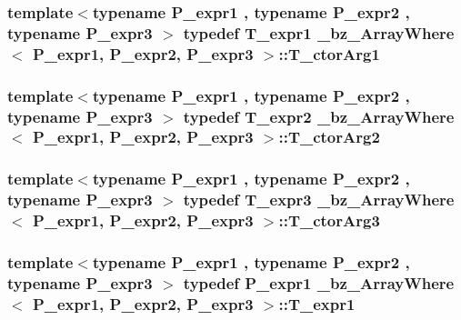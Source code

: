\subsubsection[{T\+\_\+ctor\+Arg1}]{\setlength{\rightskip}{0pt plus 5cm}template$<$typename P\+\_\+expr1 , typename P\+\_\+expr2 , typename P\+\_\+expr3 $>$ typedef {\bf T\+\_\+expr1} {\bf \+\_\+bz\+\_\+\+Array\+Where}$<$ P\+\_\+expr1, P\+\_\+expr2, P\+\_\+expr3 $>$\+::{\bf T\+\_\+ctor\+Arg1}}\label{class__bz__ArrayWhere_a32c58caf104cc6fe6f26de21ebacf028}
\hypertarget{class__bz__ArrayWhere_ab66d71f81e4b0458bb111d8a723e8caa}{}
\subsubsection[{T\+\_\+ctor\+Arg2}]{\setlength{\rightskip}{0pt plus 5cm}template$<$typename P\+\_\+expr1 , typename P\+\_\+expr2 , typename P\+\_\+expr3 $>$ typedef {\bf T\+\_\+expr2} {\bf \+\_\+bz\+\_\+\+Array\+Where}$<$ P\+\_\+expr1, P\+\_\+expr2, P\+\_\+expr3 $>$\+::{\bf T\+\_\+ctor\+Arg2}}\label{class__bz__ArrayWhere_ab66d71f81e4b0458bb111d8a723e8caa}
\hypertarget{class__bz__ArrayWhere_a5ae4e744d3c88348295b3976c109122d}{}
\subsubsection[{T\+\_\+ctor\+Arg3}]{\setlength{\rightskip}{0pt plus 5cm}template$<$typename P\+\_\+expr1 , typename P\+\_\+expr2 , typename P\+\_\+expr3 $>$ typedef {\bf T\+\_\+expr3} {\bf \+\_\+bz\+\_\+\+Array\+Where}$<$ P\+\_\+expr1, P\+\_\+expr2, P\+\_\+expr3 $>$\+::{\bf T\+\_\+ctor\+Arg3}}\label{class__bz__ArrayWhere_a5ae4e744d3c88348295b3976c109122d}
\hypertarget{class__bz__ArrayWhere_a04df7e7b7c476f0412969686fe06b7eb}{}
\subsubsection[{T\+\_\+expr1}]{\setlength{\rightskip}{0pt plus 5cm}template$<$typename P\+\_\+expr1 , typename P\+\_\+expr2 , typename P\+\_\+expr3 $>$ typedef P\+\_\+expr1 {\bf \+\_\+bz\+\_\+\+Array\+Where}$<$ P\+\_\+expr1, P\+\_\+expr2, P\+\_\+expr3 $>$\+::{\bf T\+\_\+expr1}}\label{class__bz__ArrayWhere_a04df7e7b7c476f0412969686fe06b7eb}
\hypertarget{class__bz__ArrayWhere_aa417b5b88df486cc569c08a17c071aac}{}
